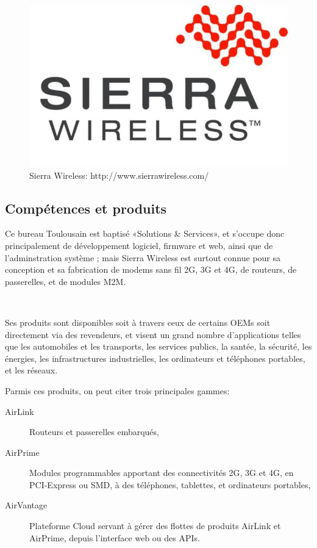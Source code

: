 \documentclass{article}
\begin{document}
\begin{figure}[h!]
    \centering\includegraphics[width=\linewidth/2]{img/swir.jpg}
    \caption{Sierra Wireless: http://www.sierrawireless.com/}
\end{figure}

\subsection{Compétences et produits}

Ce bureau Toulousain est baptisé «Solutions \& Services», et s’occupe donc principalement de développement logiciel, firmware et web, ainsi que de l’adminstration système ; mais Sierra Wireless est surtout connue pour sa conception et sa fabrication de modems sans fil 2G, 3G et 4G, de routeurs, de passerelles, et de modules M2M.

~

Ses produits sont disponibles soit à travers ceux de certains OEMs soit directement via des revendeurs, et visent un grand nombre d’applications telles que les automobiles et les transports, les services publics, la santée, la sécurité, les énergies, les infrastructures industrielles, les ordinateurs et téléphones portables, et les réseaux.

Parmis ces produits, on peut citer trois principales gammes:

\begin{description}
    \item[AirLink] Routeurs et passerelles embarqués,
    \item[AirPrime] Modules programmables apportant des connectivités 2G, 3G et 4G, en PCI-Express ou SMD, à des téléphones, tablettes, et ordinateurs portables,
    \item[AirVantage] Plateforme Cloud servant à gérer des flottes de produits AirLink et AirPrime, depuis l’interface web ou des APIs.
\end{description}
\end{document}

